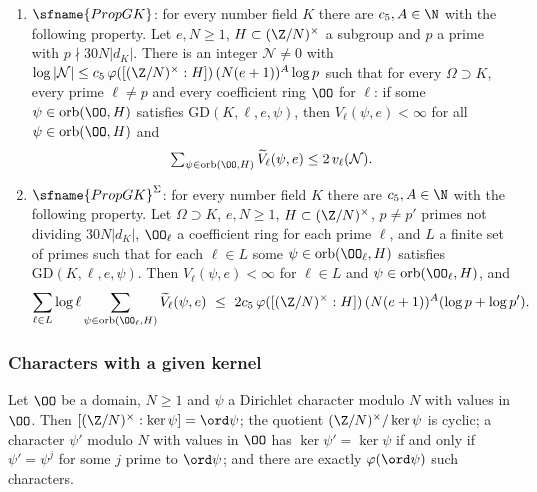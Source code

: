 \begin{definition}\label{pf:eis:propGK}
\leavevmode
\begin{enumerate}[label=(\alph*)]
\item $\sfname{PropGK}$: for every number field $K$ there are $c_5,A\in\N$ with the following property. Let $e,N\ge1$,
  $H\subset(\Z/N)^\times$ a subgroup and $p$ a prime with $p\nmid30N|d_K|$. There is an integer $\mathcal N\ne0$ with
  $\log|\mathcal N|\le c_5\,\varphi([(\Z/N)^\times:H])\,(N(e+1))^A\log p$ such that for every $\Omega\supset K$, every prime
  $\ell\ne p$ and every coefficient ring $\OO$ for $\ell$: if some $\psi\in\mathrm{orb}(\OO,H)$ satisfies
  $\mathrm{GD}(K,\ell,e,\psi)$, then $V_\ell(\psi,e)<\infty$ for all $\psi\in\mathrm{orb}(\OO,H)$ and
  \[\textstyle\sum_{\psi\in\mathrm{orb}(\OO,H)}\eisVt_\ell(\psi,e)\le2\,\eisv(\mathcal N).\]
\item $\sfname{PropGK}^{\Sigma}$: for every number field $K$ there are $c_5,A\in\N$ with the following property. Let $\Omega\supset K$,
  $e,N\ge1$, $H\subset(\Z/N)^\times$, $p\ne p'$ primes not dividing $30N|d_K|$, $\OO_\ell$ a coefficient ring for each prime
  $\ell$, and $L$ a finite set of primes such that for each $\ell\in L$ some $\psi\in\mathrm{orb}(\OO_\ell,H)$ satisfies
  $\mathrm{GD}(K,\ell,e,\psi)$. Then $V_\ell(\psi,e)<\infty$ for $\ell\in L$ and $\psi\in\mathrm{orb}(\OO_\ell,H)$, and
  \[
   \sum_{\ell\in L}\log\ell\sum_{\psi\in\mathrm{orb}(\OO_\ell,H)}\eisVt_\ell(\psi,e)\ \le\
   2c_5\,\varphi([(\Z/N)^\times:H])\,(N(e+1))^A(\log p+\log p').
  \]
\end{enumerate}
\end{definition}

\subsubsection{Characters with a given kernel}

\begin{lemma}\label{pf:eis:orb}
Let $\OO$ be a domain, $N\ge1$ and $\psi$ a Dirichlet character modulo $N$ with values in $\OO$. Then
$[(\Z/N)^\times:\ker\psi]=\ord\psi$; the quotient $(\Z/N)^\times/\ker\psi$ is cyclic; a character $\psi'$ modulo $N$ with
values in $\OO$ has $\ker\psi'=\ker\psi$ if and only if $\psi'=\psi^j$ for some $j$ prime to $\ord\psi$; and there are
exactly $\varphi(\ord\psi)$ such characters.
\end{lemma}

